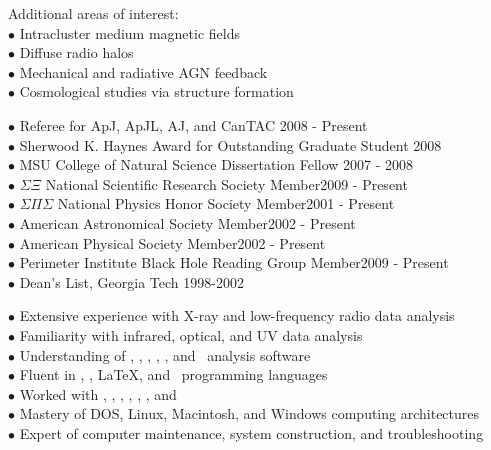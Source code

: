 \documentclass[12pt]{cv}
\begin{document}
\begin{llist}
Additional areas of interest:\\
$\bullet$ Intracluster medium magnetic fields\\
$\bullet$ Diffuse radio halos\\
$\bullet$ Mechanical and radiative AGN feedback\\
$\bullet$ Cosmological studies via structure formation


$\bullet$ Referee for ApJ, ApJL, AJ, and CanTAC \hfill 2008 - Present\\
$\bullet$ Sherwood K. Haynes Award for Outstanding Graduate Student \hfill 2008\\
$\bullet$ MSU College of Natural Science Dissertation Fellow \hfill 2007 - 2008\\
$\bullet$ $\Sigma \Xi$ National Scientific Research Society Member\hfill 2009 - Present\\
$\bullet$ $\Sigma \Pi \Sigma$ National Physics Honor Society Member\hfill 2001 - Present\\
$\bullet$ American Astronomical Society Member\hfill 2002 - Present\\
$\bullet$ American Physical Society Member\hfill 2002 - Present\\
$\bullet$ Perimeter Institute Black Hole Reading Group Member\hfill 2009 - Present\\
$\bullet$ Dean's List, Georgia Tech \hfill 1998-2002


$\bullet$ Extensive experience with X-ray and low-frequency radio data analysis\\
$\bullet$ Familiarity with infrared, optical, and UV data analysis\\
$\bullet$ Understanding of \aips, \casa, \ciao, \iraf, \osa, and \sas\ analysis software\\
$\bullet$ Fluent in \html, \idl, \LaTeX, and \perl\ programming languages\\
$\bullet$ Worked with \clang, \flash, \fortran, \mysql, \python, \supmo, and \tcl\\
$\bullet$ Mastery of DOS, Linux, Macintosh, and Windows computing architectures\\
$\bullet$ Expert of computer maintenance, system construction, and troubleshooting


\end{llist}
\end{document}
